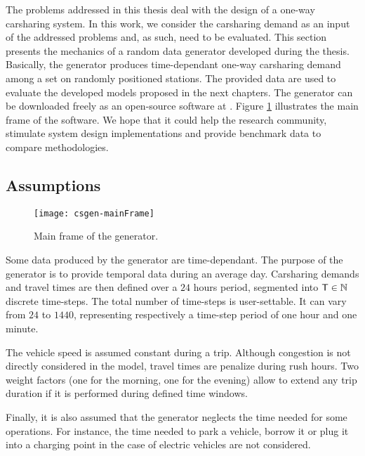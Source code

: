 \begin{bibunit}[ieeetr]
\medskip
The problems addressed in this thesis deal with the design of a one-way carsharing system.
In this work, we consider the carsharing demand as an input of the addressed problems and, as such, need to be evaluated.
This section presents the mechanics of a random data generator developed during the thesis.
Basically, the generator produces time-dependant one-way carsharing demand among a set on randomly positioned stations.
The provided data are used to evaluate the developed models proposed in the next chapters.
The generator can be downloaded freely as an open-source software at \cite{csgen}.
Figure \ref{fig:csgen-mainFrame} illustrates the main frame of the software.
We hope that it could help the research community, stimulate system design implementations and provide benchmark data to compare methodologies.


\subsection{Assumptions}

\begin{figure}[!h]
\centering
\texttt{[image: csgen-mainFrame]}
\caption{Main frame of the generator.}
\label{fig:csgen-mainFrame}
\end{figure}

Some data produced by the generator are time-dependant.
The purpose of the generator is to provide temporal data during an average day.
Carsharing demands and travel times are then defined over a $24$ hours period, segmented into $\mathsf{T} \in \mathbb{N}$ discrete time-steps.
The total number of time-steps is user-settable.
It can vary from $24$ to $1440$, representing respectively a time-step period of one hour and one minute.

\medskip
The vehicle speed is assumed constant during a trip.
Although congestion is not directly considered in the model, travel times are penalize during rush hours.
Two weight factors (one for the morning, one for the evening) allow to extend any trip duration if it is performed during defined time windows.

\medskip
Finally, it is also assumed that the generator neglects the time needed for some operations.
For instance, the time needed to park a vehicle, borrow it or plug it into a charging point in the case of electric vehicles are not considered.



\end{bibunit}
